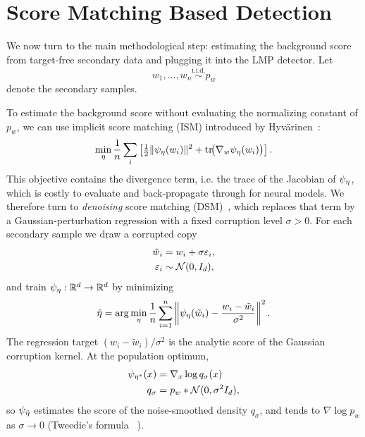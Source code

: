 \chapter{Score Matching Based Detection}
\label{score_matching_detection}
\label{sec:score_matching_detection}
We now turn to the main methodological step: estimating the background score from target-free secondary data and plugging it into the LMP detector. Let
\begin{equation}
    w_1,\ldots,w_n \overset{\mathrm{i.i.d.}}{\sim} p_w
\end{equation}
denote the secondary samples.

To estimate the background score without evaluating the normalizing constant of $p_w$, we can use implicit score matching (ISM) introduced by Hyv\"arinen~\cite{hyvarinen2005estimation}:
\begin{equation}
    \min_\eta \frac{1}{n} \sum_i \left[
        \tfrac{1}{2}\|\psi_\eta(w_i)\|^2
        + \operatorname{tr}\!\bigl(\nabla_w \psi_\eta(w_i)\bigr)
    \right].
\end{equation}
This objective contains the divergence term, i.e. the trace of the Jacobian of $\psi_\eta$, which is costly to evaluate and back-propagate through for neural models. We therefore turn to
\emph{denoising} score matching (DSM)~\cite{vincent2011connection},
which replaces that term by a Gaussian-perturbation regression with a fixed corruption
level $\sigma>0$. For each secondary sample we draw a corrupted copy
\begin{align}
    \tilde w_i &= w_i + \sigma\varepsilon_i,
    \nonumber\\
    \varepsilon_i&\sim \mathcal{N}(0,I_d),
\end{align}
and train $\psi_\eta:\mathbb{R}^d\to\mathbb{R}^d$ by minimizing
\begin{equation}
    \hat\eta
    = \arg\min_\eta
    \frac1n\sum_{i=1}^n
    \left\|
    \psi_\eta(\tilde w_i) - \frac{w_i-\tilde w_i}{\sigma^2}
    \right\|^2.
    \label{eq:DART_objective}
\end{equation}
The regression target $(w_i-\tilde w_i)/\sigma^2$ is the analytic score of the Gaussian
corruption kernel. At the population optimum,
\begin{align}
    \psi_{\eta^*}(x)
    &= \nabla_x \log q_\sigma(x)\nonumber\\
    q_\sigma &= p_w * \mathcal{N}(0,\sigma^2 I_d),
\end{align}
so $\psi_{\hat\eta}$ estimates the score of the noise-smoothed density $q_\sigma$, and
tends to $\nabla\log p_w$ as $\sigma\to0$ (Tweedie's formula~\cite{efron2011tweedie}%
). 

